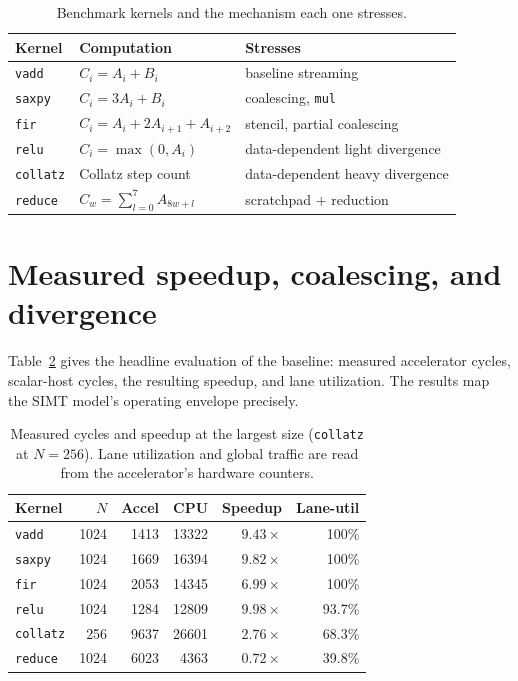 \documentclass[12pt,a4paper,oneside]{report}
\newcommand{\code}[1]{\texttt{#1}}
\begin{document}
\begin{table}[t]
\caption{Benchmark kernels and the mechanism each one stresses.}
\label{tab:kernels}
\centering
\small
\begin{tabular}{lll}
\toprule
Kernel & Computation & Stresses\\
\midrule
\code{vadd}    & $C_i=A_i+B_i$              & baseline streaming\\
\code{saxpy}   & $C_i=3A_i+B_i$            & coalescing, \code{mul}\\
\code{fir}     & $C_i=A_i+2A_{i+1}+A_{i+2}$ & stencil, partial coalescing\\
\code{relu}    & $C_i=\max(0,A_i)$         & data-dependent light divergence\\
\code{collatz} & Collatz step count        & data-dependent heavy divergence\\
\code{reduce}  & $C_w=\sum_{l=0}^{7}A_{8w+l}$ & scratchpad $+$ reduction\\
\bottomrule
\end{tabular}
\end{table}

\section{Measured speedup, coalescing, and divergence}
Table~\ref{tab:speedup} gives the headline evaluation of the baseline: measured
accelerator cycles, scalar-host cycles, the resulting speedup, and lane
utilization. The results map the SIMT model's operating envelope precisely.

\begin{table}[t]
\caption{Measured cycles and speedup at the largest size (\code{collatz} at
$N{=}256$). Lane utilization and global traffic are read from the accelerator's
hardware counters.}
\label{tab:speedup}
\centering
\small
\begin{tabular}{lrrrrr}
\toprule
Kernel & $N$ & Accel & CPU & Speedup & Lane-util\\
\midrule
\code{vadd}    & 1024 & \num{1413} & \num{13322} & $9.43\times$ & 100\%\\
\code{saxpy}   & 1024 & \num{1669} & \num{16394} & $9.82\times$ & 100\%\\
\code{fir}     & 1024 & \num{2053} & \num{14345} & $6.99\times$ & 100\%\\
\code{relu}    & 1024 & \num{1284} & \num{12809} & $9.98\times$ & 93.7\%\\
\code{collatz} &  256 & \num{9637} & \num{26601} & $2.76\times$ & 68.3\%\\
\code{reduce}  & 1024 & \num{6023} &  \num{4363} & $0.72\times$ & 39.8\%\\
\bottomrule
\end{tabular}
\end{table}
\end{document}
